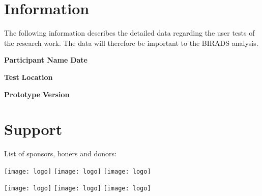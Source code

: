 
\section*{Information}

The following information describes the detailed data regarding the user tests of the research work. The data will therefore be important to the BIRADS analysis.

\vspace{1cm}

\textbf{Participant Name} \hfill \textbf{Date}

\vspace{2.5cm}

\textbf{Test} \hfill \textbf{Location}

\vspace{2.5cm}

\textbf{Prototype} \hfill \textbf{Version}

\vfill


\section*{Support}

\hfill

List of sponsors, honers and donors:

\hfill


\hfill

\texttt{[image: logo]} \hfill \texttt{[image: logo]} \hfill \texttt{[image: logo]}

\texttt{[image: logo]} \hfill \texttt{[image: logo]} \hfill \texttt{[image: logo]}

\hfill

